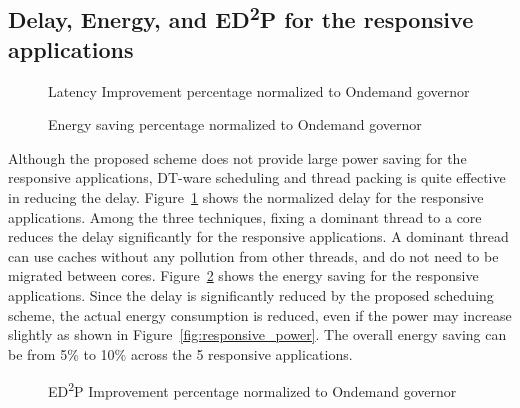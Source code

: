 \subsection{Delay, Energy, and ED\textsuperscript{2}P for the responsive applications}

\begin{figure}[bt]
\begin{center}
\end{center}
\caption{Latency Improvement percentage normalized to Ondemand governor}
\label{fig:responsive_latency_result}
\end{figure}

\begin{figure}[bt]
\begin{center}
\end{center}
\caption{Energy saving percentage normalized to Ondemand governor}
\label{fig:responsive_energy_result}
\end{figure}

Although the proposed scheme does not provide large power saving for the responsive applications, DT-ware scheduling and
thread packing is quite effective in reducing the delay. Figure~\ref{fig:responsive_latency_result} shows 
the normalized delay for the responsive applications. Among the three techniques, fixing a dominant thread to
a core reduces the delay significantly for the responsive applications. A dominant thread can use
caches without any pollution from other threads, and do not need to be migrated between cores.
Figure~\ref{fig:responsive_energy_result} shows the energy saving for the responsive applications. 
Since the delay is significantly reduced by the proposed scheduing scheme, the actual energy consumption
is reduced, even if the power may increase slightly as shown in Figure~\ref{fig:responsive_power}.
The overall energy saving can be from 5\% to 10\% across the 5 responsive applications.

\begin{figure}[bt]
\begin{center}
\end{center}
\caption{ED\textsuperscript{2}P Improvement percentage normalized to Ondemand governor}
\label{fig:responsive_EDP_result}
\end{figure}

